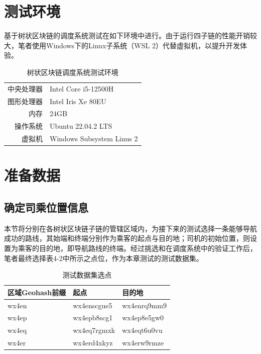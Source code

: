 \section{测试环境}

基于树状区块链的调度系统测试在如下环境中进行。由于运行四子链的性能开销较大，笔者使用Windows下的Linux子系统（WSL 2）代替虚拟机，以提升开发体验。

\begin{table}[htbp]
    \linespread{1.5}
    \centering
    \caption{树状区块链调度系统测试环境}\label{树状区块链调度系统测试环境}
    \begin{tabular}{r|l} \toprule
        中央处理器 & Intel Core i5-12500H      \\
        图形处理器 & Intel Iris Xe 80EU        \\
        内存    & 24GB                      \\
        操作系统  & Ubuntu 22.04.2 LTS        \\
        虚拟机   & Windows Subsystem Linus 2 \\
        \bottomrule
    \end{tabular}
\end{table}

\section{准备数据}

\subsection{确定司乘位置信息}

本节将分别在各树状区块链子链的管辖区域内，为接下来的测试选择一条能够导航成功的路线，其始端和终端分别作为乘客的起点与目的地；司机的初始位置，则设置为乘客的目的地，即导航路线的终端。经过挑选和在调度系统中的验证工作后，笔者最终选择表4-2中所示之点位，作为本章测试的测试数据集。

\begin{table}[htbp]
    \linespread{1.5}
    \centering
    \caption{测试数据集选点}\label{测试数据集选点}
    \begin{tabular}{l|l|l} \toprule
        区域Geohash前缀 & 起点          & 目的地         \\\hline
        wx4en       & wx4enscgue5 & wx4enrq9mm9 \\
        wx4ep       & wx4epb8scg1 & wx4ep8e5gw0 \\
        wx4eq       & wx4eq7rgmxk & wx4eqt6u0vu \\
        wx4er       & wx4erd4xkyz & wx4erw9rmze \\
        \bottomrule
    \end{tabular}
\end{table}

